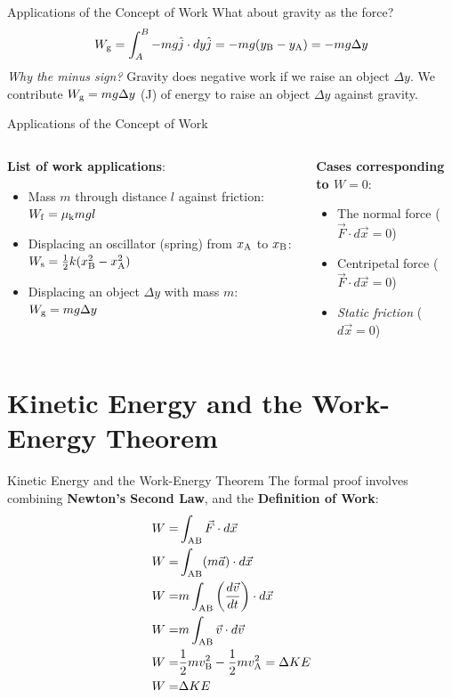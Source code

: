 \documentclass{beamer}
\begin{document}
\begin{frame}{Applications of the Concept of Work}
What about gravity as the force?
\begin{equation}
W_{\rm g} = \int_{A}^{B} -mg \hat{j} \cdot dy \hat{j} = -mg(y_{\rm B} - y_{\rm A}) = -mg\Delta y
\end{equation}
\textit{Why the minus sign?}  Gravity does negative work if we raise an object $\Delta y$.  We contribute $W_{\rm g} = mg\Delta y$ (J) of energy to raise an object $\Delta y$ against gravity.
\end{frame}

\begin{frame}{Applications of the Concept of Work}
\begin{columns}[T]
\begin{column}{0.5\textwidth}
\small
\textbf{List of work applications}:
\begin{itemize}
\item Mass $m$ through distance $l$ against friction: $W_{\rm f} = \mu_{\rm k} m g l$
\item Displacing an oscillator (spring) from $x_{\rm A}$ to $x_{\rm B}$: $W_{\rm s} = \frac{1}{2}k(x_{\rm B}^2 - x_{\rm A}^2)$
\item Displacing an object $\Delta y$ with mass $m$: $W_{\rm g} = mg\Delta y$
\end{itemize}
\end{column}
\begin{column}{0.5\textwidth}
\small
\textbf{Cases corresponding to $W=0$}:
\begin{itemize}
\item The normal force ($\vec{F} \cdot d\vec{x} = 0$)
\item Centripetal force ($\vec{F} \cdot d\vec{x} = 0$)
\item \textit{Static friction} ($d\vec{x} = 0$)
\end{itemize}
\end{column}
\end{columns}
\end{frame}

\section{Kinetic Energy and the Work-Energy Theorem}

\begin{frame}{Kinetic Energy and the Work-Energy Theorem}
The formal proof involves combining \textbf{Newton's Second Law}, and the \textbf{Definition of Work}:
\begin{align}
W =& \int_{\rm AB} \vec{F} \cdot d\vec{x} \\
W =& \int_{\rm AB} (m\vec{a}) \cdot d\vec{x} \\
W =& m\int_{\rm AB} \left( \frac{d\vec{v}}{dt} \right) \cdot d\vec{x} \\
W =& m\int_{\rm AB} \vec{v} \cdot d\vec{v} \\
W =& \frac{1}{2}m v_{\rm B}^2 - \frac{1}{2}m v_{\rm A}^2 = \Delta KE \\
W =& \Delta KE
\end{align}
\end{frame}
\end{document}

